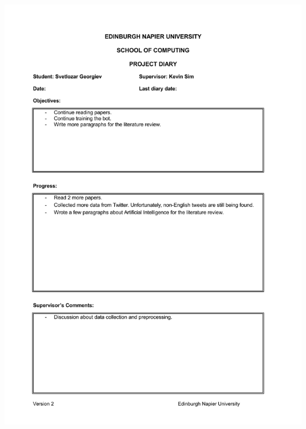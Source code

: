 \documentclass[12pt,a4paper]{article}
\begin{document}
\begin{appendices}
\includegraphics[width=\textwidth,height=\textheight,keepaspectratio]{week7.jpg}
\newpage

\end{appendices}
\end{document}

